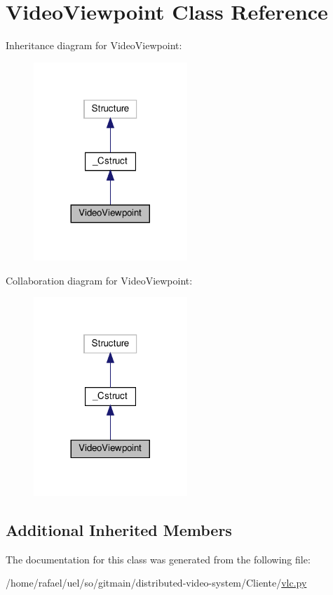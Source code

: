\hypertarget{classvlc_1_1_video_viewpoint}{}\section{Video\+Viewpoint Class Reference}
\label{classvlc_1_1_video_viewpoint}


Inheritance diagram for Video\+Viewpoint\+:
\nopagebreak
\begin{figure}[H]
\begin{center}
\leavevmode
\includegraphics[width=164pt]{classvlc_1_1_video_viewpoint__inherit__graph}
\end{center}
\end{figure}


Collaboration diagram for Video\+Viewpoint\+:
\nopagebreak
\begin{figure}[H]
\begin{center}
\leavevmode
\includegraphics[width=164pt]{classvlc_1_1_video_viewpoint__coll__graph}
\end{center}
\end{figure}
\subsection*{Additional Inherited Members}


The documentation for this class was generated from the following file\+:\begin{DoxyCompactItemize}
\item 
/home/rafael/uel/so/gitmain/distributed-\/video-\/system/\+Cliente/\hyperlink{vlc_8py}{vlc.\+py}\end{DoxyCompactItemize}
